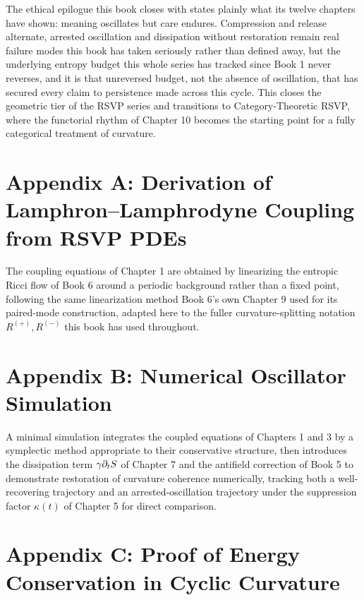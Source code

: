 The ethical epilogue this book closes with states plainly what its twelve chapters have shown: meaning oscillates but care endures. Compression and release alternate, arrested oscillation and dissipation without restoration remain real failure modes this book has taken seriously rather than defined away, but the underlying entropy budget this whole series has tracked since Book 1 never reverses, and it is that unreversed budget, not the absence of oscillation, that has secured every claim to persistence made across this cycle. This closes the geometric tier of the RSVP series and transitions to Category-Theoretic RSVP, where the functorial rhythm of Chapter 10 becomes the starting point for a fully categorical treatment of curvature.

\chapter*{Appendix A: Derivation of Lamphron--Lamphrodyne Coupling from RSVP PDEs}

The coupling equations of Chapter 1 are obtained by linearizing the entropic Ricci flow of Book 6 around a periodic background rather than a fixed point, following the same linearization method Book 6's own Chapter 9 used for its paired-mode construction, adapted here to the fuller curvature-splitting notation $R^{(+)}, R^{(-)}$ this book has used throughout.

\chapter*{Appendix B: Numerical Oscillator Simulation}

A minimal simulation integrates the coupled equations of Chapters 1 and 3 by a symplectic method appropriate to their conservative structure, then introduces the dissipation term $\gamma \partial_t S$ of Chapter 7 and the antifield correction of Book 5 to demonstrate restoration of curvature coherence numerically, tracking both a well-recovering trajectory and an arrested-oscillation trajectory under the suppression factor $\kappa(t)$ of Chapter 5 for direct comparison.

\chapter*{Appendix C: Proof of Energy Conservation in Cyclic Curvature}

